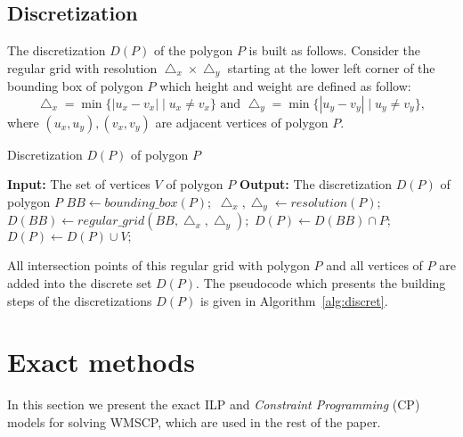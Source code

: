 \documentclass[runningheads,a4paper]{elsarticle}
\begin{document}
	
	\subsection{Discretization}
	The discretization $D(P)$ of the polygon $P$ is built as follows. Consider the regular grid with resolution $\bigtriangleup_{x}\times\bigtriangleup_{y}$ starting at the lower left corner of the bounding box of polygon $P$ which height and weight are defined as follow:
	\begin{equation}
         \bigtriangleup_{x}=\min\{ |u_{x}-v_{x}|\mid u_{x}\neq v_{x}\} \mbox{ and }
         \bigtriangleup_{y}=\min\{ |u_{y}-v_{y}|\mid u_{y}\neq v_{y}\},
 	\end{equation}
where $ (u_{x},u_{y}),(v_{x},v_{y})$ are adjacent vertices of polygon $P$.
	
	\begin{algorithm}[!t]
		\caption{Discretization $D(P)$ of polygon $P$}\label{alg:discret}
		\begin{algorithmic}[1]
			\State \textbf{Input:} The set of vertices $V$ of polygon $P$
			\State \textbf{Output:} The discretization $D(P)$ of polygon $P$
			\State $BB \gets bounding\_box(P);$
			\State $\bigtriangleup_{x},\bigtriangleup_{y} \gets resolution(P);$
			\State $D(BB) \gets regular\_grid(BB,\bigtriangleup_{x},\bigtriangleup_{y});$
			\State $D(P) \gets D(BB) \cap P;$
			\State $D(P) \gets D(P) \cup V;$
		\end{algorithmic}
	\end{algorithm}

	All intersection points of this regular grid with polygon $P$ and all vertices of $P$ are added into the discrete set $D(P)$. The pseudocode which presents the building steps of the discretizations $D(P)$ is given in Algorithm~\ref{alg:discret}.
	
	
	\section{Exact methods}
	In this section we present the exact ILP and \emph{Constraint Programming} (CP) models for solving WMSCP, which are used  in the rest of the paper.
\end{document}
